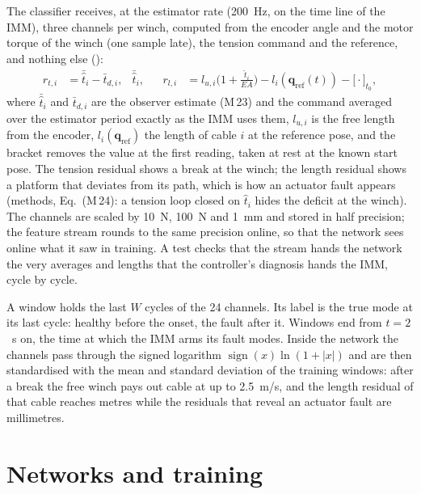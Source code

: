\documentclass[10pt]{article}
\newcommand{\vc}[1]{\bm{#1}}
\begin{document}
The classifier receives, at the estimator rate (200~Hz, on the time line of the IMM), three channels per winch, computed from the encoder angle and the motor torque of the winch (one sample late), the tension command and the reference, and nothing else ():
\begin{align}
r_{t,i} &= \bar{\hat t}_i-\bar t_{d,i}, &
\bar{\hat t}_i, &&
r_{l,i} &= l_{u,i}\Big(1+\frac{\hat t_i}{EA}\Big)-l_i(\vc q_{\mathrm{ref}}(t))-\big[\cdot\big]_{t_0},
\end{align}
where $\bar{\hat t}_i$ and $\bar t_{d,i}$ are the observer estimate (M\,23) and the command averaged over the estimator period exactly as the IMM uses them, $l_{u,i}$ is the free length from the encoder, $l_i(\vc q_{\mathrm{ref}})$ the length of cable $i$ at the reference pose, and the bracket removes the value at the first reading, taken at rest at the known start pose. The tension residual shows a break at the winch; the length residual shows a platform that deviates from its path, which is how an actuator fault appears (methods, Eq.~(M\,24): a tension loop closed on $\hat t_i$ hides the deficit at the winch). The channels are scaled by 10~N, 100~N and 1~mm and stored in half precision; the feature stream rounds to the same precision online, so that the network sees online what it saw in training. A test checks that the stream hands the network the very averages and lengths that the controller's diagnosis hands the IMM, cycle by cycle.

A window holds the last $W$ cycles of the 24 channels. Its label is the true mode at its last cycle: healthy before the onset, the fault after it. Windows end from $t=2$~s on, the time at which the IMM arms its fault modes. Inside the network the channels pass through the signed logarithm $\operatorname{sign}(x)\ln(1+|x|)$ and are then standardised with the mean and standard deviation of the training windows: after a break the free winch pays out cable at up to 2.5~m/s, and the length residual of that cable reaches metres while the residuals that reveal an actuator fault are millimetres.

\section{Networks and training}\label{sec:nets}
\end{document}
